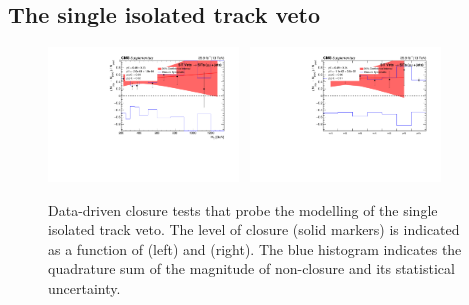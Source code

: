 \clearpage
\subsection{The single isolated track veto}

\begin{figure}[h!]
  \begin{center}
    \includegraphics[width=0.45\textwidth]{figures/closureTests/SITV/DoubleMu_Sit_ht.pdf}~
    \includegraphics[width=0.45\textwidth]{figures/closureTests/SITV/DoubleMu_Sit_nJet.pdf}\\
    \caption{Data-driven closure tests that probe the modelling of the
      single isolated track veto. The level of closure (solid markers)
      is indicated as a function of \scalht (left) and \njet
      (right). The blue histogram indicates the quadrature sum of the
      magnitude of non-closure and its statistical uncertainty. }
    \label{fig:closure_SITV_mu}
  \end{center} 
\end{figure}

